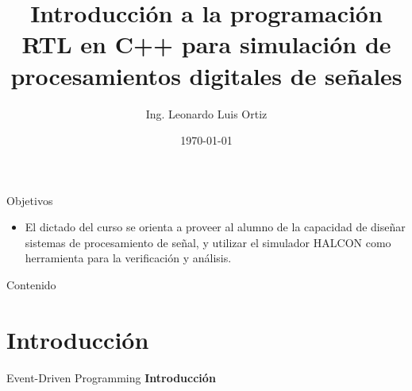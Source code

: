 \documentclass[11pt]{beamer}
\author[LLO]{Ing. Leonardo Luis Ortiz}
\title{Introducción a la programación RTL en C++ para simulación de procesamientos digitales de señales}
\institute[]{Instituto Balseiro \par Centro Atómico Bariloche}
\date{\today}
\begin{document}
	
	\begin{frame}
		\titlepage
	\end{frame}
	
	\begin{frame}{Objetivos}
	\begin{itemize}
		\item El dictado del curso se orienta a proveer al alumno de la capacidad de diseñar sistemas de procesamiento de señal, y utilizar el simulador HALCON como herramienta para la verificación y análisis.
	\end{itemize}
	\end{frame}
	
	\begin{frame}{Contenido}
		\tableofcontents 
	\end{frame}
	
	
	\section{Introducción}
	\begin{frame}{Event-Driven Programming}
	\huge \centering
	\textbf{Introducción}
	\end{frame}
	
\end{document}
